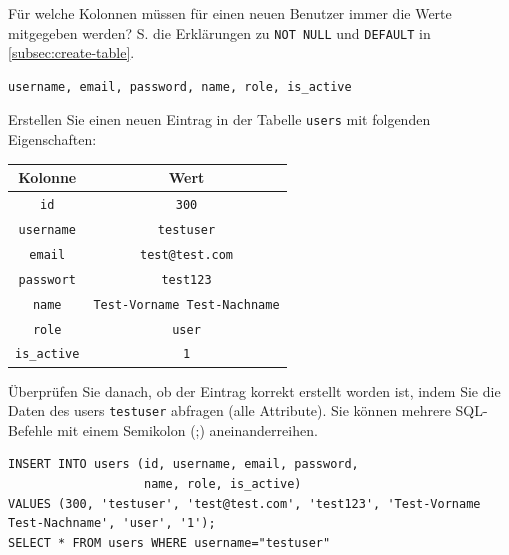 \begin{myexercise}
  Für welche Kolonnen müssen für einen neuen Benutzer immer die Werte mitgegeben werden? S. die Erklärungen zu \lstinline[style=sql]|NOT NULL| und \lstinline[style=sql]|DEFAULT| in \cref{subsec:create-table}.
  \begin{myanswer}
    \begin{verbatim}
username, email, password, name, role, is_active
\end{verbatim}
  \end{myanswer}
\end{myexercise}
\begin{mysubmission}
  Erstellen Sie einen neuen Eintrag in der Tabelle \texttt{users} mit folgenden Eigenschaften:
  \begin{table}[H]
    \centering
    \begin{tabular}{c|c}
      \textbf{Kolonne}    & \textbf{Wert}                       \\\midrule
      \texttt{id}         & \texttt{300}                        \\
      \texttt{username}   & \texttt{testuser}                   \\
      \texttt{email}      & \texttt{test@test.com}              \\
      \texttt{passwort}   & \texttt{test123}                    \\
      \texttt{name}       & \texttt{Test-Vorname Test-Nachname} \\
      \texttt{role}       & \texttt{user}                       \\
      \texttt{is\_active} & \texttt{1}                          \\
    \end{tabular}
  \end{table}
  Überprüfen Sie danach, ob der Eintrag korrekt erstellt worden ist, indem Sie die Daten des users \texttt{testuser} abfragen (alle Attribute). Sie können mehrere SQL-Befehle mit einem Semikolon (;) aneinanderreihen.
  \begin{myanswer}
    \begin{lstlisting}[style=sql]
INSERT INTO users (id, username, email, password, 
				   name, role, is_active) 
VALUES (300, 'testuser', 'test@test.com', 'test123', 'Test-Vorname Test-Nachname', 'user', '1');
SELECT * FROM users WHERE username="testuser"
\end{lstlisting}
  \end{myanswer}
\end{mysubmission}


